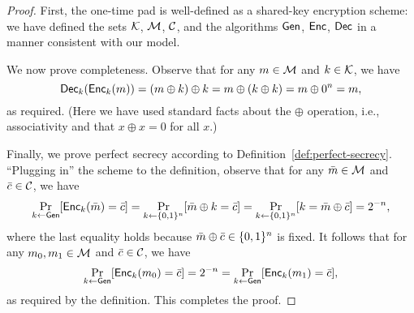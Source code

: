 \documentclass[11pt]{article}
\begin{document}
\begin{proof}
  First, the one-time pad is well-defined as a shared-key encryption
  scheme: we have defined the sets $\mathcal{K}$, $\mathcal{M}$,
  $\mathcal{C}$, and the algorithms $\mathsf{Gen}$, $\mathsf{Enc}$, $\mathsf{Dec}$ in a
  manner consistent with our model.

  We now prove completeness.  Observe that for any $m \in \mathcal{M}$
  and $k \in \mathcal{K}$, we have \[ \mathsf{Dec}_{k}(\mathsf{Enc}_{k}(m)) = (m
  \oplus k) \oplus k = m \oplus (k \oplus k) = m \oplus 0^{n} = m, \]
  as required.  (Here we have used standard facts about the $\oplus$
  operation, i.e., associativity and that $x \oplus x = 0$ for all
  $x$.)

  Finally, we prove perfect secrecy according to
  Definition~\ref{def:perfect-secrecy}.  ``Plugging in'' the scheme to
  the definition, observe that for any $\bar{m} \in \mathcal{M}$ and
  $\bar{c} \in \mathcal{C}$, we have \[ \Pr_{k \gets
    \mathsf{Gen}}[\mathsf{Enc}_{k}(\bar{m}) = \bar{c}] = \Pr_{k \gets
    \{0,1\}^{n}}[\bar{m} \oplus k = \bar{c}] = \Pr_{k \gets \{0,1\}^{n}}[k =
  \bar{m} \oplus \bar{c}] = 2^{-n}, \] where the last equality holds
  because $\bar{m} \oplus \bar{c} \in \{0,1\}^{n}$ is fixed. It follows
  that for any $m_{0}, m_{1} \in \mathcal{M}$ and $\bar{c} \in
  \mathcal{C}$, we have \[ \Pr_{k \gets \mathsf{Gen}}[\mathsf{Enc}_{k}(m_{0}) =
  \bar{c}] = 2^{-n} = \Pr_{k \gets \mathsf{Gen}}[\mathsf{Enc}_{k}(m_{1}) =
  \bar{c}], \] as required by the definition.  This completes the
  proof.
\end{proof}
\end{document}
